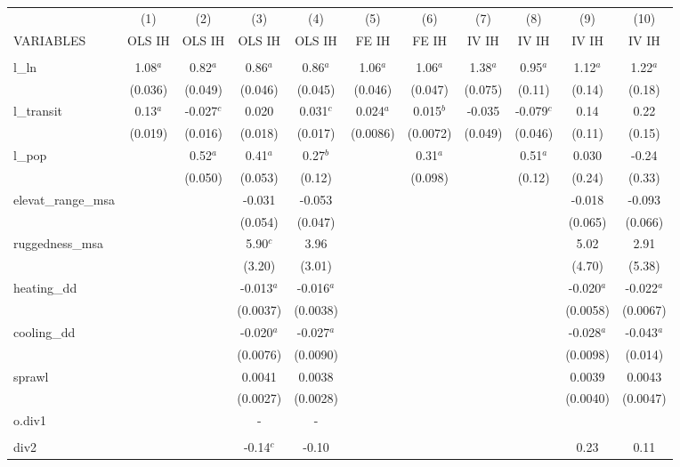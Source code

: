 \documentclass[]{article}
\begin{document}
\begin{tabular}{lcccccccccc} \hline
 & (1) & (2) & (3) & (4) & (5) & (6) & (7) & (8) & (9) & (10) \\
VARIABLES & OLS IH & OLS IH & OLS IH & OLS IH & FE IH & FE IH & IV IH & IV IH & IV IH & IV IH \\ \hline
 &  &  &  &  &  &  &  &  &  &  \\
l\_ln & 1.08$^a$ & 0.82$^a$ & 0.86$^a$ & 0.86$^a$ & 1.06$^a$ & 1.06$^a$ & 1.38$^a$ & 0.95$^a$ & 1.12$^a$ & 1.22$^a$ \\
 & (0.036) & (0.049) & (0.046) & (0.045) & (0.046) & (0.047) & (0.075) & (0.11) & (0.14) & (0.18) \\
l\_transit & 0.13$^a$ & -0.027$^c$ & 0.020 & 0.031$^c$ & 0.024$^a$ & 0.015$^b$ & -0.035 & -0.079$^c$ & 0.14 & 0.22 \\
 & (0.019) & (0.016) & (0.018) & (0.017) & (0.0086) & (0.0072) & (0.049) & (0.046) & (0.11) & (0.15) \\
l\_pop &  & 0.52$^a$ & 0.41$^a$ & 0.27$^b$ &  & 0.31$^a$ &  & 0.51$^a$ & 0.030 & -0.24 \\
 &  & (0.050) & (0.053) & (0.12) &  & (0.098) &  & (0.12) & (0.24) & (0.33) \\
elevat\_range\_msa &  &  & -0.031 & -0.053 &  &  &  &  & -0.018 & -0.093 \\
 &  &  & (0.054) & (0.047) &  &  &  &  & (0.065) & (0.066) \\
ruggedness\_msa &  &  & 5.90$^c$ & 3.96 &  &  &  &  & 5.02 & 2.91 \\
 &  &  & (3.20) & (3.01) &  &  &  &  & (4.70) & (5.38) \\
heating\_dd &  &  & -0.013$^a$ & -0.016$^a$ &  &  &  &  & -0.020$^a$ & -0.022$^a$ \\
 &  &  & (0.0037) & (0.0038) &  &  &  &  & (0.0058) & (0.0067) \\
cooling\_dd &  &  & -0.020$^a$ & -0.027$^a$ &  &  &  &  & -0.028$^a$ & -0.043$^a$ \\
 &  &  & (0.0076) & (0.0090) &  &  &  &  & (0.0098) & (0.014) \\
sprawl &  &  & 0.0041 & 0.0038 &  &  &  &  & 0.0039 & 0.0043 \\
 &  &  & (0.0027) & (0.0028) &  &  &  &  & (0.0040) & (0.0047) \\
o.div1 &  &  & - & - &  &  &  &  &  &  \\
 &  &  &  &  &  &  &  &  &  &  \\
div2 &  &  & -0.14$^c$ & -0.10 &  &  &  &  & 0.23 & 0.11 \\

\end{tabular}
\end{document}
